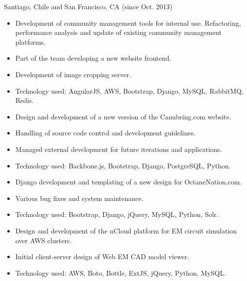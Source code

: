 \documentclass[sans,letter]{moderncv}
\begin{document}
{Santiago, Chile and San Francisco, CA (since Oct. 2013)}{}
{\begin{itemize}
  \item Development of community management tools for internal use.
  Refactoring, performance analysis and update of existing community
  management platforms.
  \item Part of the team developing a new website frontend.
  \item Development of image cropping server.
  \item Technology used: AngularJS, AWS, Bootstrap, Django, MySQL, RabbitMQ, Redis.
\end{itemize}}

{\begin{itemize}
  \item Design and development of a new version of the Canubring.com website.
  \item Handling of source code control and development guidelines.
  \item Managed external development for future iterations and
  applications.
  \item Technology used: Backbone.js, Bootstrap, Django, PostgreSQL, Python.
\end{itemize}}

{\begin{itemize}
  \item Django development and templating of a new design for OctaneNation.com.
  \item Various bug fixes and system maintenance.
  \item Technology used: Bootstrap, Django, jQuery, MySQL, Python, Solr.
\end{itemize}}

{}{\begin{itemize}
  \item Design and development of the nCloud platform for EM circuit simulation
  over AWS clusters.
  \item Initial client-server design of Web EM CAD model viewer.
  \item Technology used: AWS, Boto, Bottle, ExtJS, jQuery, Python, MySQL.
\end{itemize}}
\end{document}
